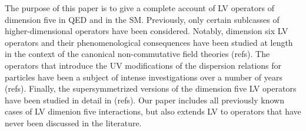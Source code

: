 \documentclass[12pt,preprintnumbers,nofootinbib]{revtex4}
\begin{document}
The purpose of this paper is to give a complete account of LV operators of dimension five 
in QED and in the SM. Previously, only certain sublcasses of higher-dimensional operators 
have been considered. Notably, dimension six LV operators and 
their phenomenological consequences 
have been studied at length in the context of the canonical non-commutative field theories (refs). 
The operators that introduce the UV modifications of the dispersion relations for particles 
have been a subject of intense investigations over a number of years (refs). Finally, the 
supersymmetrized versions of the dimension five LV operators have been studied in detail in 
(refs). Our paper includes all previously known cases of LV dimenion five interactions, but also 
extends  LV to operators that have never been discussed in the literature. 
\end{document}
